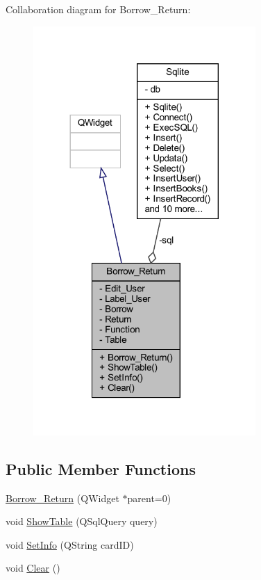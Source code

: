 Collaboration diagram for Borrow\+\_\+\+Return\+:
\nopagebreak
\begin{figure}[H]
\begin{center}
\leavevmode
\includegraphics[width=240pt]{class_borrow___return__coll__graph}
\end{center}
\end{figure}
\subsection*{Public Member Functions}
\begin{DoxyCompactItemize}
\item 
\mbox{\hyperlink{class_borrow___return_a60ee7fbb6b774305fbd655bd362572c5}{Borrow\+\_\+\+Return}} (Q\+Widget $\ast$parent=0)
\item 
void \mbox{\hyperlink{class_borrow___return_a061bb2484dacfe92218acb7d6e9494e5}{Show\+Table}} (Q\+Sql\+Query query)
\item 
void \mbox{\hyperlink{class_borrow___return_afd3bfd00077c0704c8b26f8e4254e176}{Set\+Info}} (Q\+String card\+ID)
\item 
void \mbox{\hyperlink{class_borrow___return_a65b8b7b7c224f0747c4330fb9aa6fdce}{Clear}} ()
\end{DoxyCompactItemize}
